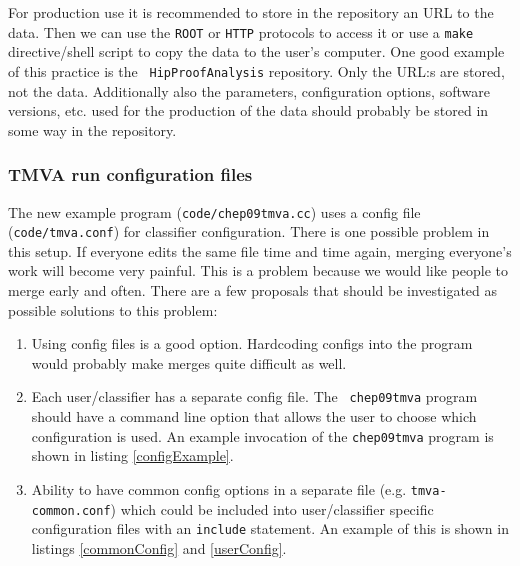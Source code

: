 \begin{appendix}
For production use it is recommended to store in the repository an URL
to the data. Then we can use the {\tt ROOT} or {\tt HTTP} protocols to
access it or use a {\tt make} directive/shell script to copy the data to the
user's computer. One good example of this practice is the {\tt
HipProofAnalysis} repository. Only the URL:s are stored, not the
data. Additionally also the parameters, configuration options,
software versions, etc. used for the production of the data should
probably be stored in some way in the repository.

\subsubsection{TMVA run configuration files}

The new example program ({\tt code/chep09tmva.cc}) uses a config file
({\tt code/tmva.conf}) for classifier configuration. There is one
possible problem in this setup. If everyone edits the same file time
and time again, merging everyone's work will become very painful. This
is a problem because we would like people to merge early and
often. There are a few proposals that should be investigated as
possible solutions to this problem:
\begin{enumerate}
\item Using config files is a good option. Hardcoding configs into
the program would probably make merges quite difficult as well.
\item Each user/classifier has a separate config file. The {\tt
chep09tmva} program should have a command line option that allows the
user to choose which configuration is used. An example invocation of
the {\tt chep09tmva} program is shown in listing \ref{configExample}.
\item Ability to have common config options in a separate file
(e.g. {\tt tmva-common.conf}) which could be included into
user/classifier specific configuration files with an {\tt include}
statement. An example of this is shown in listings \ref{commonConfig}
and \ref{userConfig}.
\end{enumerate}


\end{appendix}
